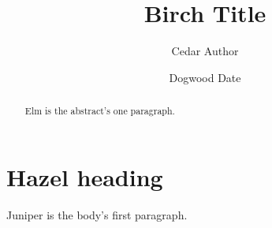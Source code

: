 \documentclass{article}
\title{Birch Title}
\author{Cedar Author}
\date{Dogwood Date}
\begin{document}
\maketitle
\begin{abstract}
Elm is the abstract's one paragraph.
\end{abstract}
\section{Hazel heading}
Juniper is the body's first paragraph.
\end{document}
